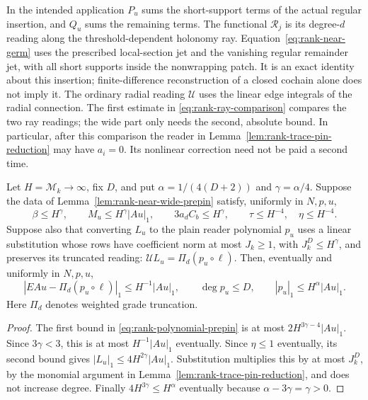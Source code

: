 In the intended application $P_u$ sums the short-support terms of the
actual regular insertion, and $Q_u$ sums the remaining terms.
The functional $\mathscr R_j$ is its degree-$d$ reading along the
threshold-dependent holonomy ray. Equation~\eqref{eq:rank-near-germ}
uses the prescribed local-section jet and the vanishing regular
remainder jet, with all short supports inside the nonwrapping patch.
It is an exact identity about this insertion; finite-difference
reconstruction of a closed cochain alone does not imply it.
The ordinary radial reading $\mathscr U$ uses the linear edge integrals
of the radial connection. The first estimate in
\eqref{eq:rank-ray-comparison} compares the two ray readings; the wide
part only needs the second, absolute bound. In particular, after this
comparison the reader in Lemma~\ref{lem:rank-trace-pin-reduction} may
have $a_i=0$. Its nonlinear correction need not be paid a second time.

\begin{corollary}
\label{cor:rank-prepin-payment}
Let $H=\mathcal M_k\to\infty$, fix $D$, and put
$\alpha=1/(4(D+2))$ and $\gamma=\alpha/4$. Suppose the data of
Lemma~\ref{lem:rank-near-wide-prepin} satisfy, uniformly in $N,p,u$,
\[
 \beta\le H^\gamma,\qquad M_u\le H^\gamma|Au|_1,
 \qquad 3a_dC_b\le H^\gamma,\qquad
 \tau\le H^{-4},\quad\eta\le H^{-4}.
\]
Suppose also that converting $L_u$ to the plain reader polynomial
$p_u$ uses a linear substitution whose rows have coefficient norm at
most $J_k\ge1$, with $J_k^D\le H^\gamma$, and preserves its truncated
reading: $\mathscr U L_u=\Pi_d(p_u\circ\ell)$.
Then, eventually and uniformly in $N,p,u$,
\[
 |EAu-\Pi_d(p_u\circ\ell)|_1\le H^{-1}|Au|_1,
 \qquad \deg p_u\le D,\qquad |p_u|_1\le H^\alpha|Au|_1.
\]
Here $\Pi_d$ denotes weighted grade truncation.
\end{corollary}
\begin{proof}
The first bound in \eqref{eq:rank-polynomial-prepin} is at most
$2H^{3\gamma-4}|Au|_1$. Since $3\gamma<3$, this is at most
$H^{-1}|Au|_1$ eventually. Since $\eta\le1$ eventually, its second
bound gives $|L_u|_1\le4H^{2\gamma}|Au|_1$. Substitution multiplies
this by at most $J_k^D$, by the monomial argument in
Lemma~\ref{lem:rank-trace-pin-reduction}, and does not increase degree.
Finally $4H^{3\gamma}\le H^\alpha$ eventually because
$\alpha-3\gamma=\gamma>0$.
\end{proof}

